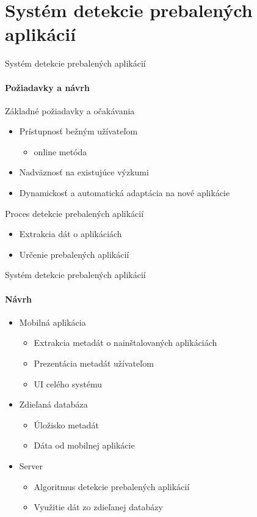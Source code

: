\documentclass{beamer}
\begin{document}
  \section{Systém detekcie prebalených aplikácií}  
  
  \begin{frame}[label=lists]{Systém detekcie prebalených aplikácií}
 	 \framesubtitle{Požiadavky a návrh}
 	Základné požiadavky a očakávania
	\begin{itemize}
	 	\item Prístupnosť bežným užívateľom
	 		\begin{itemize}
	 			\item online metóda
	 		\end{itemize}
	 	\item Nadväznosť na existujúce výzkumi
	 	\item Dynamickosť a automatická adaptácia na nové aplikácie
	\end{itemize}
	Proces detekcie prebalených aplikácií
	\begin{itemize}
 	\item Extrakcia dát o aplikáciách
 	\item Určenie prebalených aplikácií
   \end{itemize}
  \end{frame} 
  
  \begin{frame}[label=lists]{Systém detekcie prebalených aplikácií}
 	 \framesubtitle{Návrh}
	\begin{itemize}
		\item Mobilná aplikácia
			\begin{itemize}
				\item Extrakcia metadát o nainštalovaných aplikáciách
				\item Prezentácia metadát užívateľom
				\item UI celého systému
			\end{itemize}
		\item Zdieľaná databáza
			\begin{itemize}
				\item Úložisko metadát
				\item Dáta od mobilnej aplikácie
			\end{itemize}		
		\item Server
			\begin{itemize}
				\item Algoritmus detekcie prebalených aplikácií
				\item Využitie dát zo zdieľanej databázy
			\end{itemize}					
	\end{itemize}
  \end{frame}  
  
\end{document}

